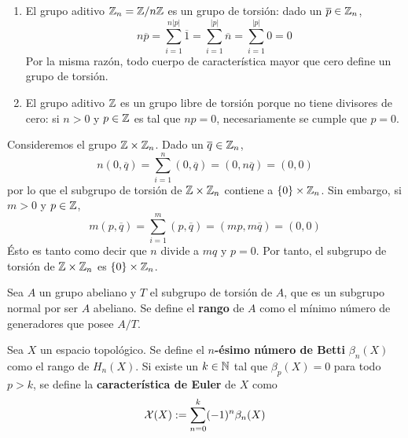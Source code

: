 \begin{example}
\begin{enumerate}
\item El grupo aditivo $\mathbb{Z}_n=\mathbb{Z}/n\mathbb{Z}$ es un grupo de torsión: dado un $\overline{p} \in
\mathbb{Z}_n$,
\[n\overline{p}=\sum^{n|p|}_{i=1}\overline{1}=\sum^{|p|}_{i=1}\overline{n}=
\sum^{|p|}_{i=1}0=0\]
Por la misma razón, todo cuerpo de característica mayor que cero define un grupo de torsión.
\item El grupo aditivo $\mathbb{Z}$ es un grupo libre de torsión porque no tiene divisores de cero: si $n > 0$ y $p \in \mathbb{Z}$ es tal que $np=0$, necesariamente se cumple que $p=0$.
\end{enumerate}
\end{example}

\begin{example}
Consideremos el grupo $\mathbb{Z}\times \mathbb{Z}_n$. Dado un $\overline{q} \in \mathbb{Z}_n$,
\[n(0,\overline{q})=\sum^n_{i=1}(0,\overline{q})=(0,n\overline{q})=(0,0)\]
por lo que el subgrupo de torsión de $\mathbb{Z}\times \mathbb{Z}_n$ contiene a
$\{0\}\times\mathbb{Z}_n$. Sin embargo, si $m > 0$ y $p \in \mathbb{Z}$,
\[m(p,\overline{q})=\sum^m_{i=1}(p,\overline{q})=(mp,m\overline{q})=(0,0)\]
Ésto es tanto como decir que $n$ divide a $mq$ y $p=0$. Por tanto, el subgrupo
de torsión de $\mathbb{Z}\times \mathbb{Z}_n$ es $\{0\}\times\mathbb{Z}_n$.
\end{example}

Sea $A$ un grupo abeliano y $T$ el subgrupo de torsión de $A$, que es un
subgrupo normal por ser $A$ abeliano. Se define el \textbf{rango} de $A$ como el
mínimo número de generadores que posee $A/T$.

\begin{definition}
Sea $X$ un espacio topológico. Se define el \textbf{$n$-ésimo número de Betti}
$\beta_n(X)$ como el rango de $H_n(X)$. Si existe un $k \in \mathbb{N}$ tal que
$\beta_p(X)=0$ para todo $p > k$, se define la \textbf{característica de Euler}
de $X$ como 
\[\mathcal{X}(X):=\sum^k_{n=0}(-1)^n\beta_n(X)\]
\end{definition}
